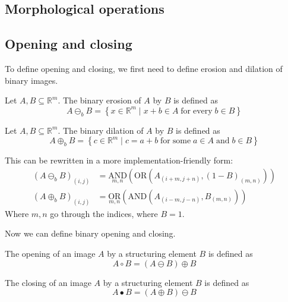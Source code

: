 \documentclass{beamer}
\begin{document}
\begin{frame}
	\section{Morphological operations}
	
	\subsection{Opening and closing}
	
	To define opening and closing, we first need to define erosion and dilation of binary images.
	
	\begin{definition}
		Let $A, B \subseteq \mathbb{R}^m$. The binary erosion of $A$ by $B$ is defined as
		\begin{equation*}
			A \ominus_b B = \left\{ x \in \mathbb{R}^m \mid x + b \in A \; \mathrm{for \; every} \; b \in B \right\}
		\end{equation*}
	\end{definition}
	\begin{definition}
		Let $A, B \subseteq \mathbb{R}^m$. The binary dilation of $A$ by $B$ is defined as
		\begin{equation*}
			A \oplus_b B = \left\{ c \in \mathbb{R}^m \mid c = a + b \; \mathrm{for \; some} \; a \in A \; \mathrm{and} \; b \in B \right\}
		\end{equation*}
	\end{definition}
	
	This can be rewritten in a more implementation-friendly form:
	\begin{align*}
		(A \ominus_b B)_{(i, j)} &= \underset{m, n}{\mathrm{AND}} \left( \mathrm{OR} (A_{(i + m, j + n)}, (1 - B)_{(m, n)}) \right) \\
		(A \oplus_b B)_{(i, j)} &= \underset{m, n}{\mathrm{OR}} \left( \mathrm{AND} (A_{(i - m, j - n)}, B_{(m, n)}) \right)
	\end{align*}
	Where $m, n$ go through the indices, where $B = 1$.
\end{frame}

\begin{frame}
	Now we can define binary opening and closing.
	
	\begin{definition}
		The opening of an image $A$ by a structuring element $B$ is defined as
		\begin{equation*}
			A \circ B = (A \ominus B) \oplus B
		\end{equation*}
	\end{definition}
	\begin{definition}
		The closing of an image $A$ by a structuring element $B$ is defined as
		\begin{equation*}
			A \bullet B = (A \oplus B) \ominus B
		\end{equation*}
	\end{definition}
\end{frame}
\end{document}
